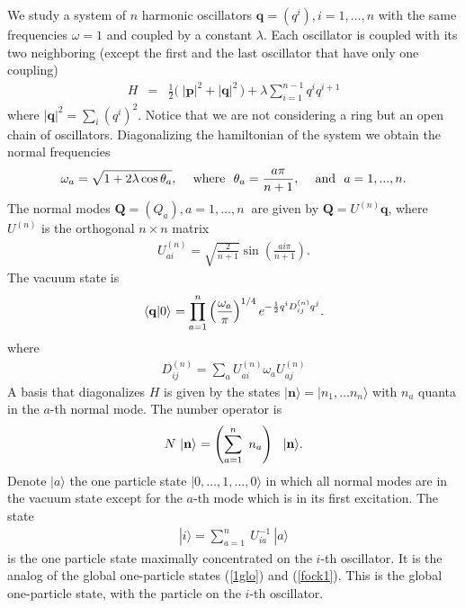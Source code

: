 \documentclass[10pt, nofootinbib]{revtex4}
\newcommand{\bea}{\begin{eqnarray}}
\newcommand{\eea}{\end{eqnarray}}
\begin{document}
We study a system of $n$ harmonic oscillators $\mathbf q=(q^i), 
i=1,\ldots, n$
with the same frequencies $\omega=1$ and coupled by a constant
$\lambda$.  Each oscillator is coupled with its two neighboring (except
the first and the last oscillator that have only one coupling)
%
\bea 
H&=&  \frac{1}{2}\big(\; |\mathbf p|^2 +|\mathbf q|^2\, 
\big) + \lambda \sum_{i=1}^{n-1}  q^{i}q^{i+1}
\label{H}
\eea
%
where $|\mathbf q|^2=\sum_i (q^i)^2$.  Notice that we are not
considering a ring but an open chain of oscillators.  Diagonalizing
the hamiltonian of the system we obtain the normal frequencies
%
\bea
\omega_a= \sqrt{1+2 \lambda \cos \theta_a}, \  \ \; \; \hbox{where} 
\  \ \theta_a = \frac{a \pi}{n+1},\; \; \  \ \hbox{and} \   \ 
a=1,...,n.
\eea
%
The normal modes $\mathbf Q=(Q_a), a=1,\ldots, n\ $ are given by
$\textbf{Q}= U^{\scriptscriptstyle{(n)}} \textbf{q}$, where $ U^{
\scriptscriptstyle{(n)}}$ is the orthogonal $n \times n$ matrix
%
\bea
U^{\scriptscriptstyle{(n)}}_{ai}= \sqrt{\frac{2}{n+1}} \sin \left( 
\frac{ai
\pi}{n+1} \right).
\label{matrix}
\eea
%
The vacuum state is
%
\bea \langle \mathbf q | 0 \rangle_{\rm } = \prod^{n}_{a=1}
\left(\frac{\omega_a}{\pi}\right)^{1/4} e^{-\frac{1}{2} 
q^i D^{\scriptscriptstyle{(n)}}_{ij} q^j}. 
\label{Pserie}
\eea
%
where
%
\bea
D^{\scriptscriptstyle{(n)}}_{ij}= \sum_{a}  U^{\scriptscriptstyle{(n)}}_{ai}
\omega_a U^{\scriptscriptstyle{(n)}}_{aj}
\label{D}
\eea
%
A basis that diagonalizes $H$ is given by the states $|\mathbf
n\rangle= |n_{1}, \ldots n_n\rangle$ with $n_{a}$
quanta in the $a$-th normal mode.  The number operator is
%
\bea 
N \  | \mathbf n \rangle_{\rm } = 
\left(\sum_{a=1}^n\ n_{a}\right)\ \  |\mathbf n\rangle
\label{numberop}. 
\eea
%
Denote $|a\rangle$ the one particle state $|0, \ldots, 1,\ldots,
0\rangle$ in which all normal modes are in the vacuum state except for
the $a$-th mode which is in its first excitation.  The state
%
\bea 
|i\rangle  = \sum_{a=1}^n\  U^{-1}_{ia}\ |a\rangle
\label{gparticle}
\eea
%
is the one particle state maximally concentrated on the $i$-th
oscillator.  It is the analog of the global one-particle states
(\ref{1glo}) and (\ref{fock1}).  This is the global one-particle
state, with the particle on the $i$-th oscillator.
\end{document}
